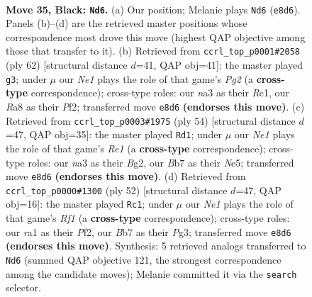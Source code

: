\documentclass[11pt]{article}
\begin{document}
\clearpage

\begin{figure}[p]\centering
\begin{subfigure}{0.46\textwidth}\centering
\resizebox{\linewidth}{!}{%
\newchessgame
\chessboard[
  setfen={r3n3/pbpp4/1p4k1/5p1p/1PP2P2/N7/P1BPK2P/R7 b - - 0 35},
  showmover=false,
  pgfstyle=straightmove, color=movearrow, markmove={e8-d6}
]}
\caption{}
\end{subfigure}\hfill
\begin{subfigure}{0.46\textwidth}\centering
\resizebox{\linewidth}{!}{%
\newchessgame
\chessboard[
  setfen={2r3k1/3n1p2/3P3B/p1P1pp2/P7/1p5P/5PP1/2R3K1 w - - 0 32},
  showmover=false,
  pgfstyle=straightmove, color=movearrow, markmove={g2-g3}
]}
\caption{}
\end{subfigure}
\\[4pt]
\begin{subfigure}{0.46\textwidth}\centering
\resizebox{\linewidth}{!}{%
\newchessgame
\chessboard[
  setfen={3rnk2/pb4pp/1p6/2pPNp2/5P2/1P4P1/P5BP/4R1K1 w - - 3 28},
  showmover=false,
  pgfstyle=straightmove, color=movearrow, markmove={e1-d1}
]}
\caption{}
\end{subfigure}\hfill
\begin{subfigure}{0.46\textwidth}\centering
\resizebox{\linewidth}{!}{%
\newchessgame
\chessboard[
  setfen={6k1/pp3pp1/7p/3rn3/3p3P/6P1/PP1BPPK1/5R2 w - - 0 27},
  showmover=false,
  pgfstyle=straightmove, color=movearrow, markmove={f1-c1}
]}
\caption{}
\end{subfigure}
\caption{\textbf{Move 35, Black: \texttt{Nd6}.} (a) Our position; Melanie plays \texttt{Nd6} (\texttt{e8d6}). Panels (b)--(d) are the retrieved master positions whose correspondence most drove this move (highest QAP objective among those that transfer to it). (b) Retrieved from \texttt{ccrl\_top\_p0001\#2058} (ply 62) [structural distance $d$=41, QAP obj=41]: the master played \texttt{g3}; under $\mu$ our \emph{Ne1} plays the role of that game's \emph{Pg2} (a \textbf{cross-type} correspondence); cross-type roles: our \emph{n}a3 as their \emph{R}c1, our \emph{R}a8 as their \emph{P}f2; transferred move \texttt{e8d6} \textbf{(endorses this move)}. (c) Retrieved from \texttt{ccrl\_top\_p0003\#1975} (ply 54) [structural distance $d$=47, QAP obj=35]: the master played \texttt{Rd1}; under $\mu$ our \emph{Ne1} plays the role of that game's \emph{Re1} (a \textbf{cross-type} correspondence); cross-type roles: our \emph{n}a3 as their \emph{B}g2, our \emph{B}b7 as their \emph{N}e5; transferred move \texttt{e8d6} \textbf{(endorses this move)}. (d) Retrieved from \texttt{ccrl\_top\_p0000\#1300} (ply 52) [structural distance $d$=47, QAP obj=16]: the master played \texttt{Rc1}; under $\mu$ our \emph{Ne1} plays the role of that game's \emph{Rf1} (a \textbf{cross-type} correspondence); cross-type roles: our \emph{r}a1 as their \emph{P}f2, our \emph{B}b7 as their \emph{P}g3; transferred move \texttt{e8d6} \textbf{(endorses this move)}. Synthesis: 5 retrieved analogs transferred to \texttt{Nd6} (summed QAP objective 121, the strongest correspondence among the candidate moves); Melanie committed it via the \texttt{search} selector.}
\label{fig:thought-m69}
\end{figure}
\end{document}
